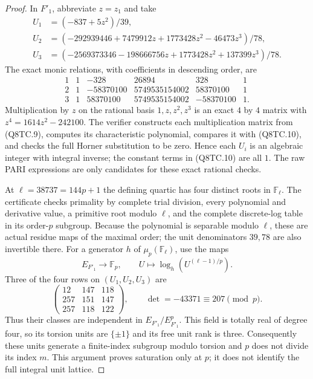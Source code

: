 \begin{proof}
In $F'_1$, abbreviate $z=z_1$ and take
\[
 \begin{aligned}
 U_1&=(-837+5z^2)/39,\\
 U_2&=(-292939446+7479912z+1773428z^2-46473z^3)/78,\\
 U_3&=(-2569373346-198666756z+1773428z^2+137399z^3)/78.
 \end{aligned}
 \tag{Q8TC.9}
\]
The exact monic relations, with coefficients in descending order,
are
\[
 \begin{array}{c|rrrrr}
 1&1&-328&26894&328&1\\
 2&1&-58370100&5749535154002&58370100&1\\
 3&1&58370100&5749535154002&-58370100&1 .
 \end{array}
 \tag{Q8TC.10}
\]
Multiplication by $z$ on the rational basis $1,z,z^2,z^3$
is an exact $4$ by $4$ matrix with
$z^4=1614z^2-242100$.
The verifier constructs each multiplication matrix from (Q8TC.9),
computes its characteristic polynomial, compares it with
(Q8TC.10), and checks the full Horner substitution to be zero.
Hence each $U_i$ is an algebraic integer with integral inverse;
the constant terms in (Q8TC.10) are all $1$.
The raw PARI expressions are only candidates for these exact
rational checks.

At $\ell=38737=144p+1$ the defining quartic has four distinct
roots in $\mathbb F_\ell$.
The certificate checks primality by complete trial division,
every polynomial and derivative value, a primitive root modulo
$\ell$, and the complete discrete-log table in its order-$p$
subgroup.  Because the polynomial is separable modulo $\ell$,
these are actual residue maps of the maximal order; the unit
denominators $39,78$ are also invertible there.
For a generator $h$ of $\mu_p(\mathbb F_\ell)$, use the maps
\[
 E_{F'_1}\longrightarrow\mathbb F_p,\qquad
       U\longmapsto\log_h(U^{(\ell-1)/p}).
 \tag{Q8TC.11}
\]
Three of the four rows on $(U_1,U_2,U_3)$ are
\[
 \begin{pmatrix}
 12&147&118\\257&151&147\\257&118&122
 \end{pmatrix},\qquad
       \det=-43371\equiv207\pmod p.
 \tag{Q8TC.12}
\]
Thus their classes are independent in $E_{F'_1}/E_{F'_1}^p$.
This field is totally real of degree four, so its torsion units
are $\{\pm1\}$ and its free unit rank is three.
Consequently these units generate a finite-index subgroup modulo
torsion and $p$ does not divide its index $m$.
This argument proves saturation only at $p$; it does not identify
the full integral unit lattice.


\end{proof}
